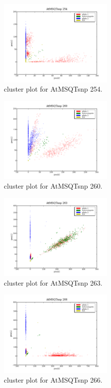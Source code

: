 \begin{figure}[H]
\includegraphics[width=0.5\textwidth]{figures/cluster_plot_AtMSQTsnp_254.png}
\caption{cluster plot for AtMSQTsnp 254.} \label{flAtMSQTsnp254}
\end{figure}

\begin{figure}[H]
\includegraphics[width=0.5\textwidth]{figures/cluster_plot_AtMSQTsnp_260.png}
\caption{cluster plot for AtMSQTsnp 260.} \label{flAtMSQTsnp260}
\end{figure}

\begin{figure}[H]
\includegraphics[width=0.5\textwidth]{figures/cluster_plot_AtMSQTsnp_263.png}
\caption{cluster plot for AtMSQTsnp 263.} \label{flAtMSQTsnp263}
\end{figure}

\begin{figure}[H]
\includegraphics[width=0.5\textwidth]{figures/cluster_plot_AtMSQTsnp_266.png}
\caption{cluster plot for AtMSQTsnp 266.} \label{flAtMSQTsnp266}
\end{figure}

